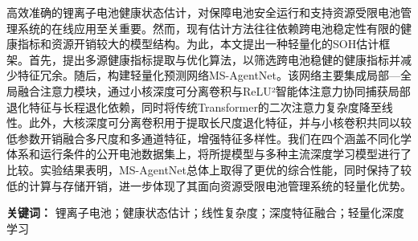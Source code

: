 高效准确的锂离子电池健康状态估计，对保障电池安全运行和支持资源受限电池管理系统的在线应用至关重要。然而，现有估计方法往往依赖跨电池稳定性有限的健康指标和资源开销较大的模型结构。为此，本文提出一种轻量化的SOH估计框架。首先，提出多源健康指标提取与优化算法，以筛选跨电池稳健的健康指标并减少特征冗余。随后，构建轻量化预测网络MS-AgentNet。该网络主要集成局部—全局融合注意力模块，通过小核深度可分离卷积与ReLU²智能体注意力协同捕获局部退化特征与长程退化依赖，同时将传统Transformer的二次注意力复杂度降至线性。此外，大核深度可分离卷积用于提取长尺度退化特征，并与小核卷积共同以较低参数开销融合多尺度和多通道特征，增强特征多样性。我们在四个涵盖不同化学体系和运行条件的公开电池数据集上，将所提模型与多种主流深度学习模型进行了比较。实验结果表明，MS-AgentNet总体上取得了更优的综合性能，同时保持了较低的计算与存储开销，进一步体现了其面向资源受限电池管理系统的轻量化优势。

\textbf{关键词：} 锂离子电池；健康状态估计；线性复杂度；深度特征融合；轻量化深度学习
